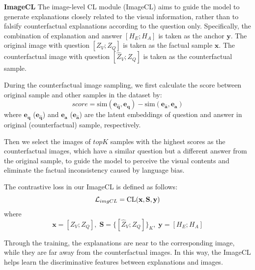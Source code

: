 \documentclass[letterpaper]{article} %
\begin{document}
\noindent
\textbf{ImageCL} The image-level CL module (ImageCL) aims to guide the model to generate explanations closely related to the visual information, rather than to falsify counterfactual explanations according to the question only. Specifically, the combination of explanation and answer $[{H_E;H_A}]$ is taken as the anchor $\mathbf{y}$. The original image with question $[{Z_V;Z_Q}]$ is taken as the factual sample $\mathbf{x}$. The counterfactual image with question $[{\hat{Z}_V;Z_Q}]$ is taken as the counterfactual sample.

During the counterfactual image sampling, we first calculate the score between original sample and other samples in the dataset by:
\begin{equation*}\label{score}
	score = \text{sim}\left(\mathbf{e_{\hat{q}}}, \mathbf{e_{q}}  \right) - \text{sim}\left(\mathbf{e_{\hat{a}}}, \mathbf{e_{a}}  \right)
\end{equation*}
where $\mathbf{e_{q}}$ ($\mathbf{e_{\hat{q}}}$) and $\mathbf{e_{a}}$ ($\mathbf{e_{\hat{a}}}$) are the latent embeddings of question and answer in original (counterfactual) sample, respectively.

Then we select the images of $topK$ samples with the highest scores as the counterfactual images, which have a similar question but a different answer from the original sample, to guide the model to perceive the visual contents and eliminate the factual inconsistency caused by language bias.

The contrastive loss in our ImageCL is defined as follows:
\begin{equation}
	\mathcal{L}_{imgCL} = \text{CL}(\mathbf{x},\mathbf{S},\mathbf{y})\\
\end{equation}
where
\begin{equation*}
	\mathbf{x}=[{Z_V;Z_Q}], \; \mathbf{S}=\{[{\hat{Z}_V;Z_Q}]\}_{K}, \; \mathbf{y}=[{H_E;H_A}]
\end{equation*}

Through the training, the explanations are near to the corresponding image, while they are far away from the counterfactual images. In this way, the ImageCL helps learn the discriminative features between explanations and images.
\end{document}
